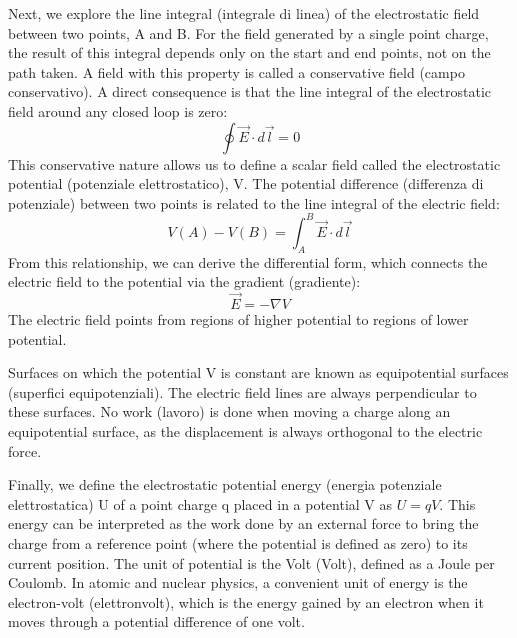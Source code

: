 Next, we explore the line integral (integrale di linea) of the electrostatic field between two points, A and B. For the field generated by a single point charge, the result of this integral depends only on the start and end points, not on the path taken. A field with this property is called a conservative field (campo conservativo). A direct consequence is that the line integral of the electrostatic field around any closed loop is zero:
\begin{equation}
    \oint \vec{E} \cdot d\vec{l} = 0
\end{equation}
This conservative nature allows us to define a scalar field called the electrostatic potential (potenziale elettrostatico), V. The potential difference (differenza di potenziale) between two points is related to the line integral of the electric field:
\begin{equation}
    V(A) - V(B) = \int_A^B \vec{E} \cdot d\vec{l}
\end{equation}
From this relationship, we can derive the differential form, which connects the electric field to the potential via the gradient (gradiente):
\begin{equation}
    \vec{E} = -\nabla V
\end{equation}
The electric field points from regions of higher potential to regions of lower potential.

Surfaces on which the potential V is constant are known as equipotential surfaces (superfici equipotenziali). The electric field lines are always perpendicular to these surfaces. No work (lavoro) is done when moving a charge along an equipotential surface, as the displacement is always orthogonal to the electric force.

Finally, we define the electrostatic potential energy (energia potenziale elettrostatica) U of a point charge q placed in a potential V as \(U = qV\). This energy can be interpreted as the work done by an external force to bring the charge from a reference point (where the potential is defined as zero) to its current position. The unit of potential is the Volt (Volt), defined as a Joule per Coulomb. In atomic and nuclear physics, a convenient unit of energy is the electron-volt (elettronvolt), which is the energy gained by an electron when it moves through a potential difference of one volt.